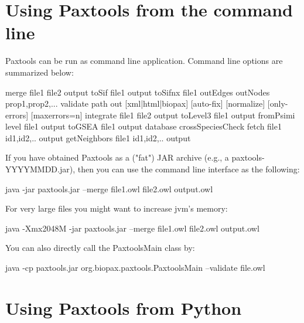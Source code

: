 \documentclass{tufte-book}
\begin{document}
\section{Using Paxtools from the command line}
\begin{fullwidth}
Paxtools can be run as command line application.  Command line options are summarized below:

\begin{xmlcode}
merge file1 file2 output
toSif file1 output
toSifnx file1 outEdges outNodes prop1,prop2,...
validate path out [xml|html|biopax] [auto-fix] [normalize] [only-errors] [maxerrors=n]
integrate file1 file2 output
toLevel3 file1 output
fromPsimi level file1 output
toGSEA file1 output database crossSpeciesCheck
fetch file1 id1,id2,.. output
getNeighbors file1 id1,id2,.. output
\end{xmlcode}
 
If you have obtained Paxtools as a ("fat") JAR archive (e.g., a paxtools-YYYYMMDD.jar), then you can use the command line interface as the following:

\begin{xmlcode}
java -jar paxtools.jar --merge file1.owl file2.owl output.owl
\end{xmlcode}

For very large files you might want to increase jvm's memory:

\begin{xmlcode}
java -Xmx2048M -jar paxtools.jar --merge file1.owl file2.owl output.owl
\end{xmlcode}

You can also directly call the PaxtoolsMain class by:

\begin{xmlcode}
java -cp paxtools.jar org.biopax.paxtools.PaxtoolsMain --validate file.owl
\end{xmlcode}
\end{fullwidth}

\section{Using Paxtools from Python}
\end{document}
